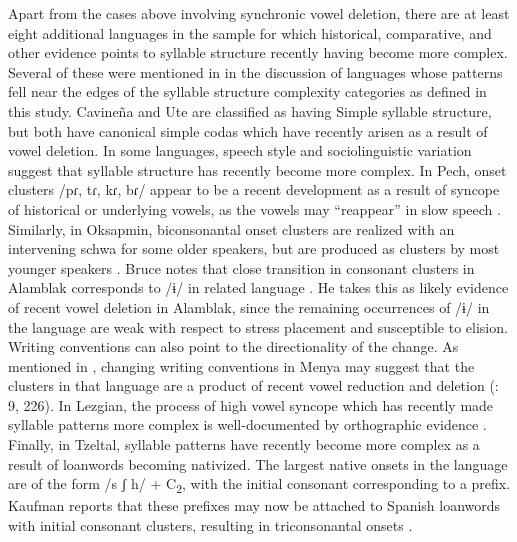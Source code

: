   Apart from the cases above involving synchronic vowel deletion, there are at least eight additional languages in the sample for which historical, comparative, and other evidence points to syllable structure recently having become more complex. Several of these were mentioned in  in the discussion of languages whose patterns fell near the edges of the syllable structure complexity categories as defined in this study. Cavineña and Ute are classified as having Simple syllable structure, but both have canonical simple codas which have recently arisen as a result of vowel deletion. In some languages, speech style and sociolinguistic variation suggest that syllable structure has recently become more complex. In Pech, onset clusters /pɾ, tɾ, kɾ, bɾ/ appear to be a recent development as a result of syncope of historical or underlying vowels, as the vowels may “reappear” in slow speech \citep[20]{Holt1999}. Similarly, in Oksapmin, biconsonantal onset clusters are realized with an intervening schwa for some older speakers, but are produced as clusters by most younger speakers \citep[65-67]{Loughnane2009}. Bruce notes that close transition in consonant clusters in Alamblak corresponds to /ɨ/ in related language \citet[69-70]{Sumariup1984}. He takes this as likely evidence of recent vowel deletion in Alamblak, since the remaining occurrences of /ɨ/ in the language are weak with respect to stress placement and susceptible to elision. Writing conventions can also point to the directionality of the change. As mentioned in , changing writing conventions in Menya may suggest that the clusters in that language are a product of recent vowel reduction and deletion (\citealt{Whitehead2004}: 9, 226). In Lezgian, the process of high vowel syncope which has recently made syllable patterns more complex is well-documented by orthographic evidence \citep[36-8]{Haspelmath1993}. Finally, in Tzeltal, syllable patterns have recently become more complex as a result of loanwords becoming nativized. The largest native onsets in the language are of the form /s ʃ h/ + C\textsubscript{2}, with the initial consonant corresponding to a prefix. Kaufman reports that these prefixes may now be attached to Spanish loanwords with initial consonant clusters, resulting in triconsonantal onsets \citep[14]{Kaufman1971}.

